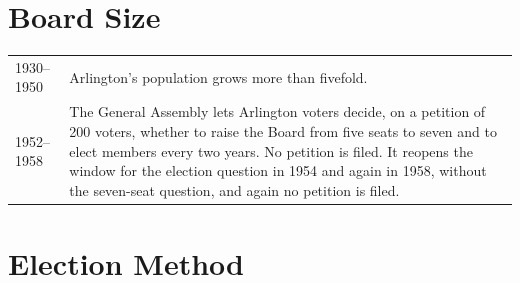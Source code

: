 \documentclass[11pt]{article}
\makeatletter
\newcommand{\timeline}[1]{%
  \begin{center}
  \begin{tabular}{@{}p{0.17\textwidth}p{0.77\textwidth}@{}}
    \toprule
    #1
    \bottomrule
  \end{tabular}
  \end{center}}
\let\oldsection\section
\renewcommand{\section}{\clearpage\oldsection}
\makeatother
\begin{document}
\section{Board Size}

\timeline{
  1930--1950 & Arlington's population grows more than fivefold.
  \\[2pt]
  1952--1958 & The General Assembly lets Arlington voters decide, on a petition
  of 200 voters, whether to raise the Board from five seats to seven and
  to elect members every two years. No petition is filed. It reopens the
  window for the election question in 1954 and again in 1958, without the
  seven-seat question, and again no petition is
  filed.\autocite{vaacts1952c591,vaacts1954c151,vaacts1958c207} \\
}

\section{Election Method}
\end{document}
